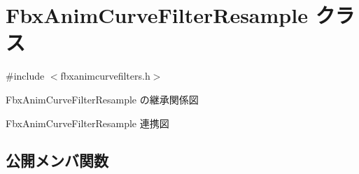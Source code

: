 \hypertarget{class_fbx_anim_curve_filter_resample}{}\section{Fbx\+Anim\+Curve\+Filter\+Resample クラス}
\label{class_fbx_anim_curve_filter_resample}


{\ttfamily \#include $<$fbxanimcurvefilters.\+h$>$}



Fbx\+Anim\+Curve\+Filter\+Resample の継承関係図


Fbx\+Anim\+Curve\+Filter\+Resample 連携図
\subsection*{公開メンバ関数}
